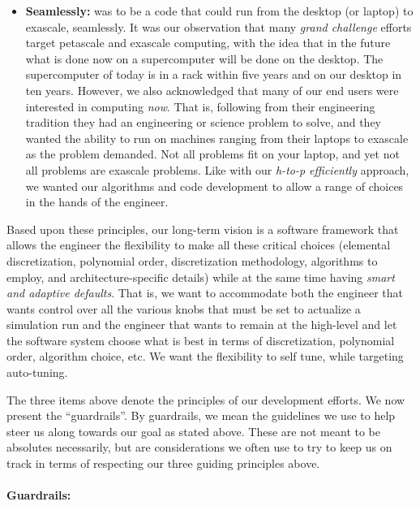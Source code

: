\begin{itemize}
\item \textbf{Seamlessly:}  {\nek} was to be a code that could run from the desktop (or laptop) to exascale, seamlessly.  It was our
observation that many {\em grand challenge} efforts target petascale and exascale computing, with the idea that in the future
what is done now on a supercomputer will be done on the desktop.  The supercomputer of today is in a rack within five
years and on our desktop in ten years.  However, we also acknowledged that many of our end users were interested in computing
{\em now}.  That is, following from their engineering tradition they had an engineering or science problem to solve, and they wanted 
the ability to run on machines ranging from their laptops to exascale as the problem demanded.  Not all problems fit on your laptop, 
and yet not all problems are exascale problems.  Like with our {\em h-to-p efficiently} approach, we wanted our algorithms and code
development to allow a range of choices in the hands of the engineer.
\end{itemize}

Based upon these principles, our long-term vision is a software framework that allows the engineer the flexibility to make all
these critical choices (elemental discretization, polynomial order, discretization methodology, algorithms to employ, and 
architecture-specific details) while at the same time having {\em smart and adaptive defaults}.  That is, we want to 
accommodate both the engineer that wants control over all the various knobs that must be set to actualize a simulation run
and the engineer that wants to remain at the high-level and let the software system choose what is best in terms of discretization,
polynomial order, algorithm choice, etc.  We want the flexibility to self tune, while targeting auto-tuning.

The three items above denote the principles of our development efforts.  We now present the ``guardrails''.  By guardrails, we mean
the guidelines we use to help steer us along towards our goal as stated above.  These are not meant to be absolutes necessarily,
but are considerations we often use to try to keep us on track in terms of respecting our three guiding principles above.

\paragraph{Guardrails:}


